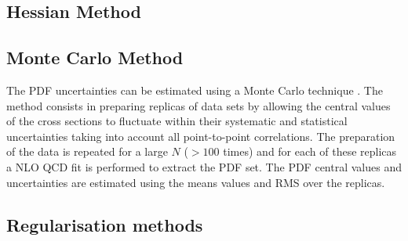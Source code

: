 \subsection{Hessian Method}

\subsection{Monte Carlo Method}


The PDF uncertainties can be estimated using a Monte Carlo technique \cite{mcmethod}.
The method consists in preparing replicas of data sets by allowing the central values of the cross sections to 
fluctuate within their systematic and statistical uncertainties taking into account all point-to-point correlations.
The preparation of the data is repeated for a large $N$ ($>100$ times) and for each of these replicas a NLO QCD fit is performed to 
extract the PDF set. The PDF central values and uncertainties are estimated using the means values and RMS 
over the replicas. 



\subsection{Regularisation methods}


